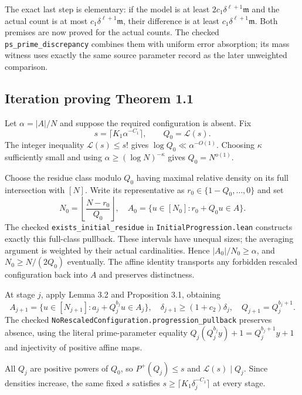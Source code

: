 The exact last step is elementary: if the model is at least $2c_1\delta^{\ell+1}\mathfrak m$ and the actual count is at most $c_1\delta^{\ell+1}\mathfrak m$, their difference is at least $c_1\delta^{\ell+1}\mathfrak m$. Both premises are now proved for the actual counts. The checked \texttt{ps\_\allowbreak{}prime\_\allowbreak{}discrepancy} combines them with uniform error absorption; its mass witness uses exactly the same source parameter record as the later unweighted comparison.
\fi

\subsection*{Iteration proving Theorem 1.1}
\ifDetailed
Let $\alpha=|A|/N$ and suppose the required configuration is absent. Fix
\[
 s=\lceil K_1\alpha^{-C_1}\rceil,\qquad Q_0=\mathcal L(s).
\]
The integer inequality $\mathcal L(s)\leq s!$ gives $\log Q_0\ll\alpha^{-O(1)}$. Choosing $\kappa$ sufficiently small and using $\alpha\geq(\log N)^{-\kappa}$ gives $Q_0=N^{o(1)}$.

Choose the residue class modulo $Q_0$ having maximal relative density on its full intersection with $[N]$. Write its representative as $r_0\in\{1-Q_0,\ldots,0\}$ and set
\[
 N_0=\left\lfloor\frac{N-r_0}{Q_0}\right\rfloor,\quad
 A_0=\{u\in[N_0]:r_0+Q_0u\in A\}.
\]
The checked \texttt{exists\_initial\_residue} in \texttt{InitialProgression.lean} constructs exactly this full-class pullback. These intervals have unequal sizes; the averaging argument is weighted by their actual cardinalities. Hence $|A_0|/N_0\geq\alpha$, and $N_0\geq N/(2Q_0)$ eventually. The affine identity transports any forbidden rescaled configuration back into $A$ and preserves distinctness.

At stage $j$, apply Lemma 3.2 and Proposition 3.1, obtaining
\[
 A_{j+1}=\{u\in[N_{j+1}]:a_j+Q_j^{b_j}u\in A_j\},\quad
 \delta_{j+1}\geq(1+c_2)\delta_j,\quad Q_{j+1}=Q_j^{b_j+1}.
\]
The checked \texttt{NoRescaledConfiguration.\allowbreak{}progression\_\allowbreak{}pullback} preserves absence, using the literal prime-parameter equality $Q_j(Q_j^{b_j}y)+1=Q_j^{b_j+1}y+1$ and injectivity of positive affine maps.

All $Q_j$ are positive powers of $Q_0$, so $P^+(Q_j)\leq s$ and $\mathcal L(s)\mid Q_j$. Since densities increase, the same fixed $s$ satisfies $s\geq\lceil K_1\delta_j^{-C_1}\rceil$ at every stage.

